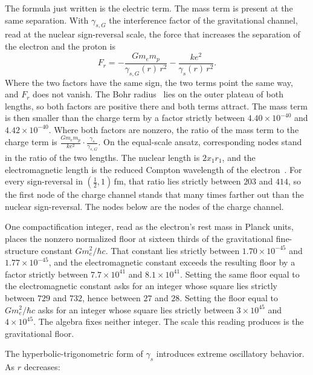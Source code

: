 \documentclass[a4paper]{article}
\begin{document}
The formula just written is the electric term. The mass term is present at the same separation. With \(\gamma_{s,G}\) the interference factor of the gravitational channel, read at the nuclear sign-reversal scale, the force that increases the separation of the electron and the proton is
\[
F_r
  =-\frac{G m_e m_p}{\gamma_{s,G}(r)\,r^{2}}
  -\frac{k e^{2}}{\gamma_s(r)\,r^{2}}.
\]
Where the two factors have the same sign, the two terms point the same way, and \(F_r\) does not vanish. The Bohr radius~\cite{bohr1913} lies on the outer plateau of both lengths, so both factors are positive there and both terms attract. The mass term is then smaller than the charge term by a factor strictly between \(4.40\times 10^{-40}\) and \(4.42\times 10^{-40}\). Where both factors are nonzero, the ratio of the mass term to the charge term is \(\frac{G m_e m_p}{k e^{2}}\cdot\frac{\gamma_s}{\gamma_{s,G}}\). On the equal-scale ansatz, corresponding nodes stand in the ratio of the two lengths. The nuclear length is \(2x_1 r_1\), and the electromagnetic length is the reduced Compton wavelength of the electron~\cite{compton1923}. For every sign-reversal in \((\tfrac12,1)\,\mathrm{fm}\), that ratio lies strictly between \(203\) and \(414\), so the first node of the charge channel stands that many times farther out than the nuclear sign-reversal. The nodes below are the nodes of the charge channel.

One compactification integer, read as the electron's rest mass in Planck units, places the nonzero normalized floor at sixteen thirds of the gravitational fine-structure constant \(G m_e^2/\hbar c\). That constant lies strictly between \(1.70\times 10^{-45}\) and \(1.77\times 10^{-45}\), and the electromagnetic constant exceeds the resulting floor by a factor strictly between \(7.7\times 10^{41}\) and \(8.1\times 10^{41}\). Setting the same floor equal to the electromagnetic constant asks for an integer whose square lies strictly between \(729\) and \(732\), hence between \(27\) and \(28\). Setting the floor equal to \(G m_e^2/\hbar c\) asks for an integer whose square lies strictly between \(3\times 10^{45}\) and \(4\times 10^{45}\). The algebra fixes neither integer. The scale this reading produces is the gravitational floor.

The hyperbolic-trigonometric form of \(\gamma_s\) introduces extreme oscillatory behavior. As \(r\) decreases:
\end{document}
